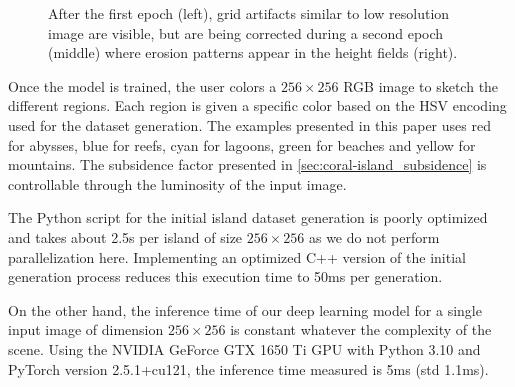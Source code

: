 \begin{figure}[t]
    \caption{After the first epoch (left), grid artifacts similar to low resolution image are visible, but are being corrected during a second epoch (middle) where erosion patterns appear in the height fields (right).}
    \label{fig:coral-island_first-epoch}
\end{figure}

Once the model is trained, the user colors a $256\times256$ RGB image to sketch the different regions. Each region is given a specific color based on the HSV encoding used for the dataset generation. The examples presented in this paper uses red for abysses, blue for reefs, cyan for lagoons, green for beaches and yellow for mountains. The subsidence factor presented in \cref{sec:coral-island_subsidence} is controllable through the luminosity of the input image. 


The Python script for the initial island dataset generation is poorly optimized and takes about 2.5s per island of size $256 \times 256$ as we do not perform parallelization here. Implementing an optimized C++ version of the initial generation process reduces this execution time to 50ms per generation.

On the other hand, the inference time of our deep learning model for a single input image of dimension $256 \times 256$ is constant whatever the complexity of the scene. Using the NVIDIA GeForce GTX 1650 Ti GPU with Python 3.10 and PyTorch version 2.5.1+cu121, the inference time measured is 5ms (std 1.1ms). 

